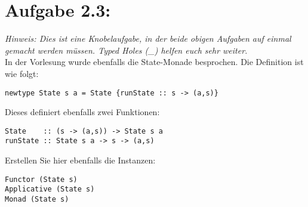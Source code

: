 \documentclass[a4paper,10pt]{scrartcl}
\newcommand{\theuebungszettel}{2}
\begin{document}
\section*{Aufgabe \theuebungszettel.3:}
\emph{Hinweis: Dies ist eine Knobelaufgabe, in der beide obigen Aufgaben auf einmal gemacht werden müssen. Typed Holes (\_) helfen euch sehr weiter.}\\
In der Vorlesung wurde ebenfalls die State-Monade besprochen. Die Definition ist wie folgt:
\begin{verbatim}
newtype State s a = State {runState :: s -> (a,s)}
\end{verbatim}
Dieses definiert ebenfalls zwei Funktionen:
\begin{verbatim}
State    :: (s -> (a,s)) -> State s a
runState :: State s a -> s -> (a,s)
\end{verbatim}
Erstellen Sie hier ebenfalls die Instanzen:
\begin{verbatim}
Functor (State s)
Applicative (State s)
Monad (State s)
\end{verbatim}
\end{document}
